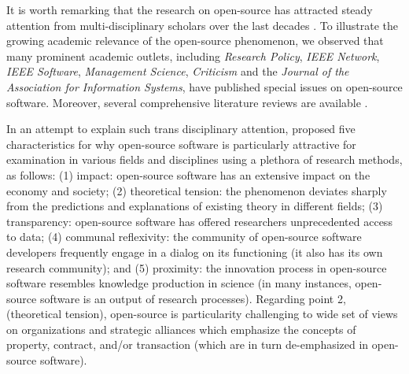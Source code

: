 \documentclass[CHICAGO,Times1COL]{WileyNJDv5} %
\begin{document}
It is worth remarking that the research on open-source  has attracted steady attention from multi-disciplinary scholars over the last decades 
\citep{feller_understanding_2002, lerner_simple_2002, raymond_cathedral_1999,weber_success_2004,von2005democratizing}.  To illustrate the growing academic relevance of the open-source phenomenon, we observed that many prominent academic outlets, including \emph{Research Policy}, \emph{IEEE Network}, \emph{IEEE Software}, \emph{Management Science}, \emph{Criticism} and the \emph{Journal of the Association for Information Systems}, have  published special issues on open-source software. Moreover, several comprehensive literature reviews are available 
\citep{aksulu_and_wade2010comprehensive_review_floss,CrowstonWei_et_al2012,hauge_adoption_2010,lindman_not_2011, stol_reporting_2009}. 


In an attempt to explain such trans disciplinary attention, \citet{vonKrogh_and_spaeth2007characteristic_OS_research}
proposed five characteristics for why open-source software is particularly attractive for examination in various fields and disciplines using a plethora of research methods, as follows: (1) impact: open-source software has an extensive impact on the economy and society; (2) theoretical tension: the phenomenon deviates sharply from the predictions and explanations of existing theory in different fields; (3) transparency: open-source software has offered researchers  unprecedented access to data; (4) communal reflexivity: the community of open-source software developers frequently engage in a dialog on its functioning (it also has its own research community); and (5) proximity: the innovation process in open-source software resembles knowledge production in science (in many instances, open-source software is an output of research processes). Regarding point 2, (theoretical tension), open-source is particularity challenging to wide set of views on organizations and strategic alliances  which emphasize the concepts of property, contract, and/or transaction (which are in turn de-emphasized in open-source software). 
\end{document}

